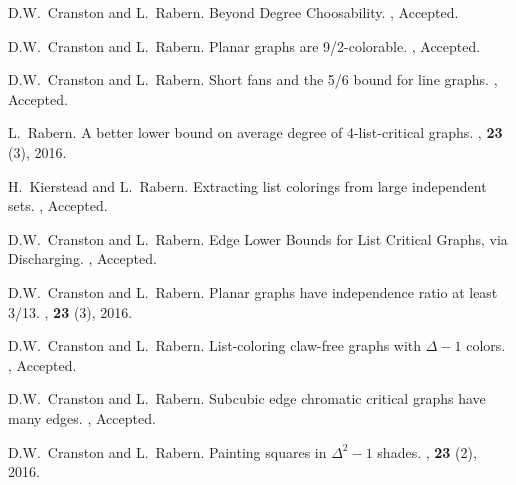 \documentclass[10pt]{article}
\begin{document}
\begin{enumerate}[{[}1{]}]\addtolength{\itemsep}{-0.5\baselineskip}
\item
	D.W.~Cranston and L.~Rabern.
	\newblock Beyond Degree Choosability.
	, Accepted.
	\smallskip
	
	\item
	D.W.~Cranston and L.~Rabern.
	\newblock Planar graphs are 9/2-colorable.
	, Accepted.
	\smallskip
	
	\item
	D.W.~Cranston and L.~Rabern.
	\newblock Short fans and the 5/6 bound for line graphs.
	, Accepted.
	\smallskip
	
\item
L.~Rabern.
\newblock A better lower bound on average degree of 4-list-critical graphs.
, \textbf{23} (3), 2016.
	
	\smallskip
	
	\item
H.~Kierstead and L.~Rabern.
\newblock Extracting list colorings from large independent sets.
, Accepted.

\smallskip

	\item
	D.W.~Cranston and L.~Rabern.
	\newblock Edge Lower Bounds for List Critical Graphs, via Discharging.
	, Accepted.
	\smallskip

\item
D.W.~Cranston and L.~Rabern.
\newblock Planar graphs have independence ratio at least 3/13.
, \textbf{23} (3), 2016.
\smallskip

\item
D.W.~Cranston and L.~Rabern.
\newblock List-coloring claw-free graphs with $\Delta - 1$ colors.
, Accepted.
\smallskip

\item
D.W.~Cranston and L.~Rabern.
\newblock Subcubic edge chromatic critical graphs have many edges.
, Accepted.
\smallskip

\item
D.W.~Cranston and L.~Rabern.
\newblock Painting squares in $\Delta^2 - 1$ shades.
, \textbf{23} (2), 2016.
	
	\smallskip
	

\end{enumerate}
\end{document}
